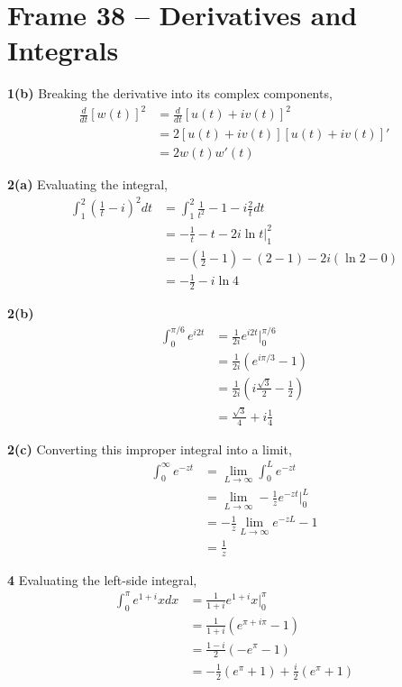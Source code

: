 \documentclass{article}
\begin{document}
\section{Frame 38 -- Derivatives and Integrals}
\textbf{1(b)}
Breaking the derivative into its complex components,
\begin{align*}
	\frac{d}{dt} [w(t)]^2
	&= \frac{d}{dt} [u(t) + iv(t)]^2 \\
	&= 2[u(t) + iv(t)][u(t) + iv(t)]' \\
	&= 2w(t)w'(t)
\end{align*}

\textbf{2(a)}
Evaluating the integral,
\begin{align*}
	\int_1^2 \left( \frac{1}{t} - i \right)^2 dt 
	&= \int_1^2 \frac{1}{t^2} - 1 - i \frac{2}{t} dt \\
	&= - \frac{1}{t} - t - 2i \ln t \Big|_1^2 \\
	&= - (\frac{1}{2} - 1) - (2 - 1) - 2i (\ln 2 - 0) \\
	&= - \frac{1}{2} - i\ln 4
\end{align*}

\textbf{2(b)}
\begin{align*}
	\int_0^{\pi/6} e^{i2t} 
	&= \frac{1}{2i} e^{i2t} \Big|_0^{\pi/6} \\
	&= \frac{1}{2i} (e^{i\pi/3} - 1) \\
	&= \frac{1}{2i} \left(i \frac{\sqrt{3}}{2} - \frac{1}{2} \right) \\
	&= \frac{\sqrt{3}}{4} + i \frac{1}{4}
\end{align*}

\textbf{2(c)}
Converting this improper integral into a limit,
\begin{align*}
	\int_0^\infty e^{-zt} 
	&= \lim_{L \to \infty} \int_0^L e^{-zt} \\
	&= \lim_{L \to \infty} - \frac{1}{z} e^{-zt} \Big|_0^L \\
	&= - \frac{1}{z} \lim_{L \to \infty} e^{-zL} - 1 \\
	&= \frac{1}{z}
\end{align*}

\textbf{4}
Evaluating the left-side integral,
\begin{align*}
	\int_0^\pi e^{1+i}x dx 
	&= \frac{1}{1+i} e^{1+i}x \Big|_0^\pi \\
	&= \frac{1}{1+i} (e^{\pi + i\pi} - 1) \\
	&= \frac{1 - i}{2} (-e^\pi - 1) \\
	&= -\frac{1}{2} (e^\pi + 1) + \frac{i}{2} (e^\pi + 1)
\end{align*}
\end{document}
